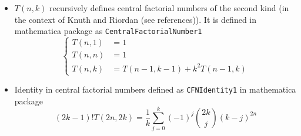 \begin{itemize}
    \item $T(n,k)$ recursively defines central factorial numbers of the second kind
    (in the context of Knuth and Riordan (see references)).
    It is defined in mathematica package as \texttt{CentralFactorialNumber1}
    \begin{equation*}
        \begin{cases}
            T(n,1) &= 1 \\
            T(n,n) &= 1 \\
            T(n,k) &= T(n-1, k-1) + k^2 T(n-1, k)
        \end{cases}
    \end{equation*}
    \item Identity in central factorial numbers defined as \texttt{CFNIdentity1} in mathematica package
    \begin{equation*}
    (2k-1)! T(2n,2k) = \frac{1}{k} \sum_{j=0}^{k} (-1)^j \binom{2k}{j} (k-j)^{2n}
    \end{equation*}
\end{itemize}